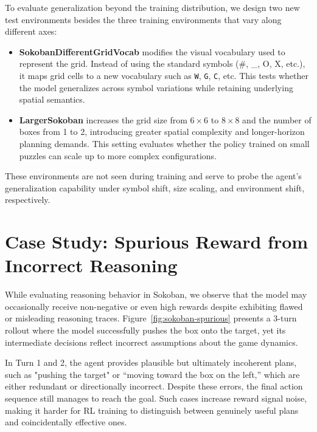 To evaluate generalization beyond the training distribution, we design two new test environments besides the three training environments that vary along different axes:

\begin{itemize}
    \item \textbf{SokobanDifferentGridVocab} modifies the visual vocabulary used to represent the grid. Instead of using the standard symbols (\#, \_, O, X, etc.), it maps grid cells to a new vocabulary such as \texttt{W}, \texttt{G}, \texttt{C}, etc. This tests whether the model generalizes across symbol variations while retaining underlying spatial semantics.
    
    \item \textbf{LargerSokoban} increases the grid size from $6 \times 6$ to $8 \times 8$ and the number of boxes from 1 to 2, introducing greater spatial complexity and longer-horizon planning demands. This setting evaluates whether the policy trained on small puzzles can scale up to more complex configurations.
\end{itemize}

These environments are not seen during training and serve to probe the agent's generalization capability under symbol shift, size scaling, and environment shift, respectively.






\section{Case Study: Spurious Reward from Incorrect Reasoning}
\label{app:case-study-spurious}

While evaluating reasoning behavior in Sokoban, we observe that the model may occasionally receive non-negative or even high rewards despite exhibiting flawed or misleading reasoning traces. Figure~\ref{fig:sokoban-spurious} presents a 3-turn rollout where the model successfully pushes the box onto the target, yet its intermediate decisions reflect incorrect assumptions about the game dynamics.

In Turn 1 and 2, the agent provides plausible but ultimately incoherent plans, such as "pushing the target" or “moving toward the box on the left,” which are either redundant or directionally incorrect. Despite these errors, the final action sequence still manages to reach the goal. Such cases increase reward signal noise, making it harder for RL training to distinguish between genuinely useful plans and coincidentally effective ones.

